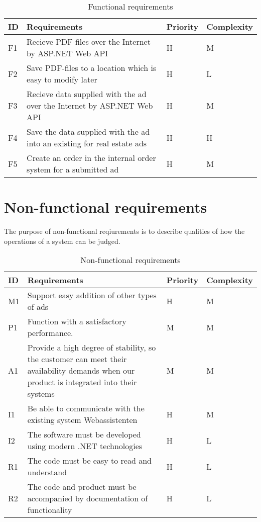 \begin{table}[H]
\begin{tabular}{|p{1.5cm}|p{8cm}|p{2cm}|p{3cm}|}
	\hline
	\textbf{ID} & \textbf{Requirements} & \textbf{Priority} & \textbf{Complexity}\\
	\hline F1 & Recieve PDF-files over the Internet by ASP.NET Web API & H & M \\
	\hline
	F2 & Save PDF-files to a location which is easy to modify later & H & L \\
	\hline
	F3 & Recieve data supplied with the ad over the Internet by ASP.NET Web API & H & M \\
	\hline
	F4 & Save the data supplied with the ad into an existing for real estate ads & H & H \\
	\hline
	F5 & Create an order in the internal order system for a submitted ad & H & M \\
	\hline
	
\end{tabular}
\caption{Functional requirements}
\end{table}

\section{Non-functional requirements} 
The purpose of non-functional reqiurements is to describe qualities of how the operations of a system can be judged. 

\normalsize
\begin{table}[H]
\begin{tabular}{|p{1.5cm}|p{8cm}|p{2cm}|p{3cm}|}
	\hline
	\textbf{ID} & \textbf{Requirements} & \textbf{Priority} & \textbf{Complexity}\\
	\hline
	M1 & Support easy addition of other types of ads & H & M \\
	\hline
	P1 & Function with a satisfactory performance. & M & M \\
	\hline
	A1 & Provide a high degree of stability, so the customer can meet their availability demands when our product is integrated into their systems & M & M\\
	\hline
	I1 & Be able to communicate with the existing system Webassistenten & H & M \\
	\hline
	I2 & The software must be developed using modern .NET technologies & H & L \\
	\hline
	R1 & The code must be easy to read and understand & H & L \\ 
	\hline
	R2 & The code and product must be accompanied by documentation of functionality & H & L \\
	\hline
	
	
\end{tabular}
\caption{Non-functional requirements}
\end{table}